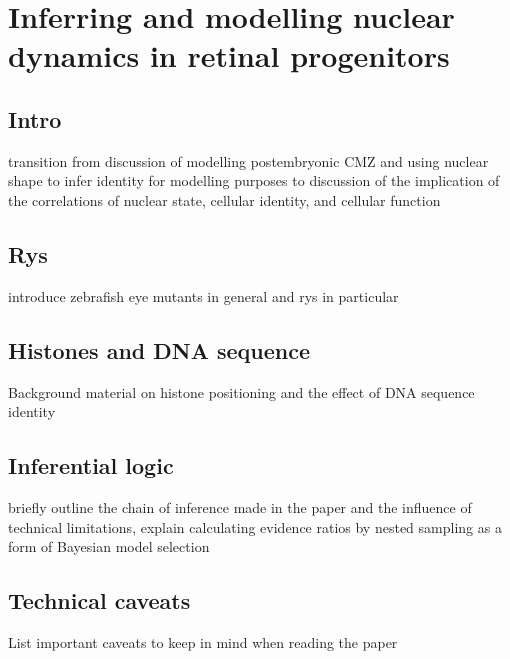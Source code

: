 \chapter{Inferring and modelling nuclear dynamics in retinal progenitors}
\label{chap:rysintro}
\section{Intro}
transition from discussion of modelling postembryonic CMZ and using nuclear shape to infer identity for modelling purposes to discussion of the implication of the correlations of nuclear state, cellular identity, and cellular function

\section{Rys}
introduce zebrafish eye mutants in general and rys in particular

\section{Histones and DNA sequence}
Background material on histone positioning and the effect of DNA sequence identity

\section{Inferential logic}
briefly outline the chain of inference made in the paper and the influence of technical limitations, explain calculating evidence ratios by nested sampling as a form of Bayesian model selection
\section{Technical caveats}
List important caveats to keep in mind when reading the paper
